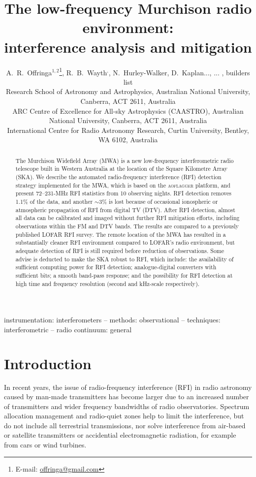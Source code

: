 \documentclass{pasa}
\title[The Murchison radio environment]{The low-frequency Murchison radio environment:\\interference analysis and mitigation}
\author[A.~R.~Offringa et al.]{A.~R.~Offringa$^{1,2}$\thanks{\editmark{Corresponding author.} E-mail: \url{offringa@gmail.com}},
R.~B.~Wayth\Curtin$^,$\CAASTRO,
N.~Hurley-Walker\Curtin,
D.~Kaplan...,
... , %
builders list
\\
\ANU{}Research School of Astronomy and Astrophysics, Australian National University, Canberra, ACT 2611, Australia \\
\CAASTRO{}ARC Centre of Excellence for All-sky Astrophysics (CAASTRO), Australian National University, Canberra, ACT 2611, Australia \\
\Curtin{}International Centre for Radio Astronomy Research, Curtin University, Bentley, WA 6102, Australia\\
}
\begin{document}
\begin{abstract}
The Murchison Widefield Array (MWA) is a new low-frequency interferometric radio telescope built in Western Australia at the location of the Square Kilometre Array (SKA). We describe the automated radio-frequency interference (RFI) detection strategy implemented for the MWA, which is based on the \textsc{aoflagger} platform, and present 72--231-MHz RFI statistics from 10 observing nights. RFI detection removes 1.1\% of the data, and another $\sim3\%$ is lost because of occasional ionospheric or atmospheric propagation of RFI from digital TV (DTV). After RFI detection, almost all data can be calibrated and imaged without further RFI mitigation efforts, including observations within the FM and DTV bands. The results are compared to a previously published LOFAR RFI survey. The remote location of the MWA has resulted in a substantially cleaner RFI environment compared to LOFAR's radio environment, but adequate detection of RFI is still required before reduction of observations. Some advise is deducted to make the SKA robust to RFI, which include: the availability of sufficient computing power for RFI detection; analogue-digital converters with sufficient bits; a smooth band-pass response; and the possibility for RFI detection at high time and frequency resolution (second and kHz-scale respectively).
\end{abstract}

\maketitle


\label{firstpage}

\begin{keywords}
instrumentation: interferometers -- methods: observational -- techniques: interferometric -- radio continuum: general
\end{keywords}

\section{Introduction}
In recent years, the issue of radio-frequency interference (RFI) in radio astronomy caused by man-made transmitters has become larger due to an increased number of transmitters and wider frequency bandwidths of radio observatories. Spectrum allocation management and radio-quiet zones help to limit the interference, but do not include all terrestrial transmissions, nor solve interference from air-based or satellite transmitters or accidential electromagnetic radiation, for example from cars or wind turbines.
\end{document}
